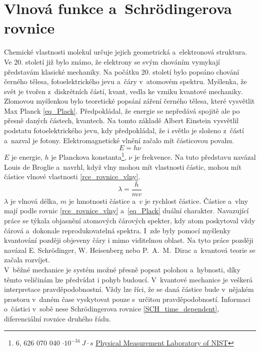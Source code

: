 \documentclass[
  printed, %
  table,   %
  lof,     %
  lot,     %
  oneside,
]{fithesis3}
\begin{document}
\section{Vlnová funkce a~Schrödingerova rovnice}
Chemické vlastnosti molekul určuje jejich geometrická a~elektronová struktura. Ve 20. století již bylo známo, že elektrony se svým chováním vymykají představám klasické mechaniky. Na počátku 20. století bylo popsáno chování černého tělesa, fotoelektrického jevu a~čáry v~atomovém spektru. Myšlenka, že svět je tvořen z~diskrétních částí, kvant, vedla ke vzniku kvantové mechaniky. Zlomovou myšlenkou bylo teoretické popsání záření černého tělesa, které vysvětlit Max Planck \ref{eq_Plack}. Předpokládal, že energie se nepředává spojitě ale po přesně daných částech, kvantech. Na tomto základě Albert Einstein vysvětlil podstatu fotoelektrického jevu, kdy předpokládal, že i světlo je složeno z~částí a~nazval je fotony. Elektromagnetické vlnění začalo mít částicovou povahu.
\begin{equation}
E = h \nu
\label{eq_Plack}
\end{equation}
$E$ je energie, $h$  je Planckova konstanta\footnote{6, 626 070 040  $\cdot 10^{-34} ~ J \cdot s$ \href{http://physics.nist.gov/cgi-bin/cuu/Value?h}{ Physical Measurement Laboratory of NIST}  }, $\nu$ je frekvence. Na tuto představu navázal Louis de Broglie a~navrhl, když vlny mohou mít vlastnosti částic, mohou mít částice vlnové vlastnosti \ref{rce_rovnice_vlny}.
\begin{equation}
\lambda = \frac{h}{mv}
\label{rce_rovnice_vlny}
\end{equation}
$\lambda$ je vlnová délka, $m$ je hmotnosti částice a~$v$ je rychlost částice. Částice a~vlny mají podle rovnic \ref{rce_rovnice_vlny} a~\ref{eq_Plack} duální charakter. Navazující práce se týkala objasnění atomových čárových spekter, kdy atom poskytoval vždy čárová a~dokonale reprodukovatelná spektra. I~zde byly pomocí myšlenky kvantování později objeveny čáry i mimo viditelnou oblast. Na tyto práce později navázal E. Schrödinger, W. Heisenberg nebo P.~A.~M.~Dirac a~kvantová teorie se začala rozvíjet. \cite{celyprincipy}\\
V~běžné mechanice je systém možné přesně popsat polohou a~hybnosti, díky těmto veličinám lze předvídat i pohyb budoucí. V~kvantové mechanice je veškerá interpretace pravděpodobnostní. Vždy lze říci, že se daná částice bude v~nějakém prostoru v~daném čase vyskytovat pouze s~určitou pravděpodobností. Informaci o~částici v~sobě nese Schrödingerova rovnice \ref{SCH_time_dependent}, diferenciální rovnice druhého řádu.\cite{polak2000obecna}
\end{document}
